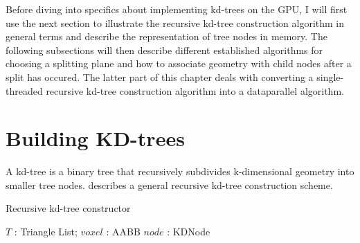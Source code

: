 Before diving into specifics about implementing kd-trees on the GPU, I will
first use the next section to illustrate the recursive kd-tree construction
algorithm in general terms and describe the representation of tree nodes in
memory. The following subsections will then describe different established
algorithms for choosing a splitting plane and how to associate geometry with
child nodes after a split has occured. The latter part of this chapter deals
with converting a single-threaded recursive kd-tree construction algorithm into
a dataparallel algorithm.



\section{Building KD-trees}

A kd-tree is a binary tree that recursively subdivides k-dimensional geometry
into smaller tree nodes.  describes a general
recursive kd-tree construction scheme.

\begin{algorithm}
  \caption{Recursive kd-tree constructor}
  \label{alg:kdTreeCreator}
  \begin{algorithmic}
              {$T$ : Triangle List; $voxel$ : AABB}
              {$node$ : KDNode}
              {
                \ELSE
                \ENDIF}
  \end{algorithmic}
\end{algorithm}


